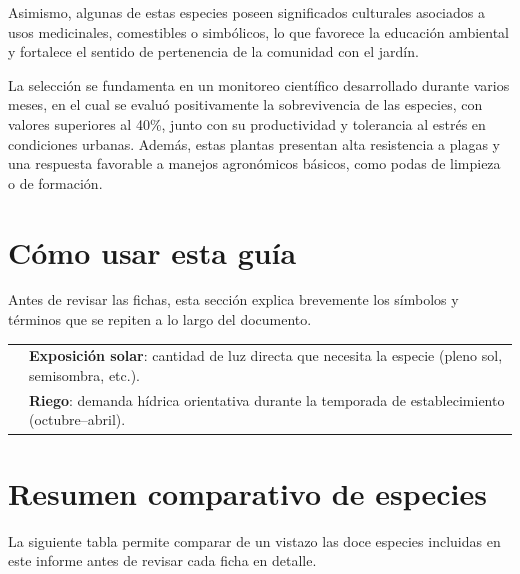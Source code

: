 \documentclass[11pt,a4paper]{article}
\newcommand{\sunicon}{%
  \begin{tikzpicture}[baseline=-0.55ex,scale=0.16]
    \draw[AccentGold,line width=1.6pt] (0,0) circle (0.9);
    \foreach \a in {0,45,90,135,180,225,270,315}{
      \draw[AccentGold,line width=1.6pt] (\a:1.25) -- (\a:1.75);
    }
  \end{tikzpicture}%
}
\newcommand{\dropicon}{%
  \begin{tikzpicture}[baseline=-0.55ex,scale=0.16]
    \fill[ForestGreen] (0,1.6) .. controls (-1.15,0.1) and (-1.15,-0.85) ..
      (0,-1.6) .. controls (1.15,-0.85) and (1.15,0.1) .. (0,1.6) -- cycle;
  \end{tikzpicture}%
}
\begin{document}
Asimismo, algunas de estas especies poseen significados culturales asociados a usos medicinales, comestibles o simbólicos, lo que favorece la educación ambiental y fortalece el sentido de pertenencia de la comunidad con el jardín.

La selección se fundamenta en un monitoreo científico desarrollado durante varios meses, en el cual se evaluó positivamente la sobrevivencia de las especies, con valores superiores al 40\%, junto con su productividad y tolerancia al estrés en condiciones urbanas. Además, estas plantas presentan alta resistencia a plagas y una respuesta favorable a manejos agronómicos básicos, como podas de limpieza o de formación.

\section{Cómo usar esta guía}
Antes de revisar las fichas, esta sección explica brevemente los símbolos y términos que se repiten a lo largo del documento.

\begin{tcolorbox}[
    colback=SoftGreen,
    colframe=ForestGreen,
    arc=2mm,
    boxrule=0.6pt,
    left=4mm,right=4mm,top=3mm,bottom=3mm
]
\begin{tabularx}{\linewidth}{c X}
\sunicon & \textbf{Exposición solar}: cantidad de luz directa que necesita la especie (pleno sol, semisombra, etc.). \\[0.4em]
\dropicon & \textbf{Riego}: demanda hídrica orientativa durante la temporada de establecimiento (octubre--abril). \\
\end{tabularx}
\end{tcolorbox}

\section{Resumen comparativo de especies}
La siguiente tabla permite comparar de un vistazo las doce especies incluidas en este informe antes de revisar cada ficha en detalle.
\end{document}
